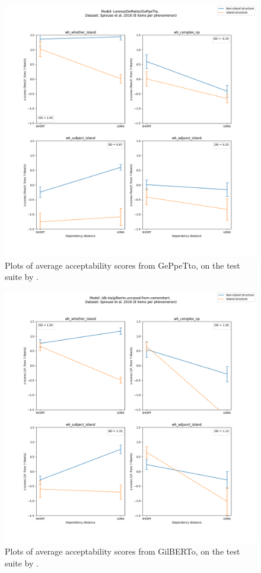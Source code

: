 \begin{figure}[p]
	\centering
	\includegraphics[width=1\textwidth]{images/Chapter1/Sprouse_wh_LorenzoDeMattei_GePpeTto_PenLP-zscores-likert-2022-09-14_h17m23s36.png} 
	\caption{Plots of average acceptability scores from GePpeTto, on the test suite by \citet{sprouse2016experimental}.}
	\label{fig:sprouse_gpt_penlp} 
	\medskip
\end{figure}	

\begin{figure}[p]
	\centering
	\includegraphics[width=1\textwidth]{images/Chapter1/Sprouse_wh_idb-ita_gilberto-uncased-from-camembert_LP-zscores-likert-2022-09-16_h10m19s47.png} 
	\caption{Plots of average acceptability scores from GilBERTo, on the test suite by \citet{sprouse2016experimental}.}
	\label{fig:sprouse_gilbertot_lp} 
	\medskip
\end{figure}	

